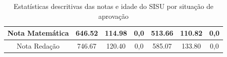 \begin{table}[]
\begin{tabular}{ccccccc}
            Nota Matemática                                                     & 646.52    & 114.98                                                  & 0,0       & 513.66    & 110.82                                                  & 0,0     \\ \hline
            Nota Redação                                                        & 746.67    & 120.40                                                  & 0,0       & 585.07    & 133.80                                                  & 0,0     \\ \hline
            \end{tabular}
            \caption{Estatísticas descritivas das notas e idade do SISU por situação de aprovação}
            \label{tab:estatistica-nota-sisu}
            \end{table}

